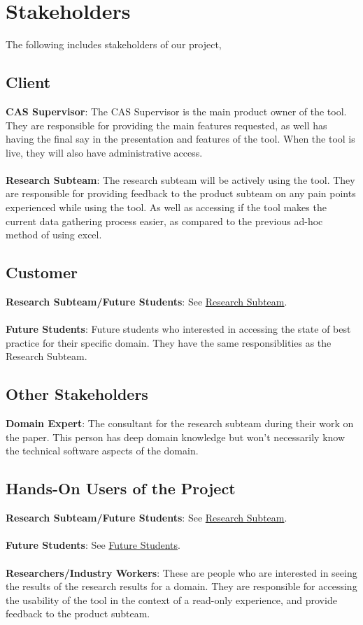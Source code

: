 \documentclass[12pt]{article}
\begin{document}
\section{Stakeholders}
The following includes stakeholders of our project, 
\subsection{Client}
\textbf{CAS Supervisor}: The CAS Supervisor is the main product owner of the tool. They are responsible for providing the main features requested, as well has having the final say in the presentation and features of the tool. When the tool is live, they will also have administrative access.
\\\\\textbf{Research Subteam}\label{research_subteam_client}: The research subteam will be actively using the tool. They are responsible for providing feedback to the product subteam on any pain points experienced while using the tool.
As well as accessing if the tool makes the current data gathering process easier, as compared to the previous ad-hoc method of using excel.
\subsection{Customer}
\textbf{Research Subteam/Future Students}: See \hyperref[research_subteam_client]{Research Subteam}.\\
\\\textbf{Future Students}\label{future_students}: Future students who interested in accessing the state of best practice for their specific domain. They have the same responsiblities as the Research Subteam.
\subsection{Other Stakeholders}
\textbf{Domain Expert}: The consultant for the research subteam during their work on the paper. This person has deep domain knowledge but won't necessarily know the technical software aspects of the domain.
\subsection{Hands-On Users of the Project}
\textbf{Research Subteam/Future Students}: See \hyperref[research_subteam_client]{Research Subteam}.\\\\
\textbf{Future Students}: See \hyperref[future_students]{Future Students}.\\\\
\textbf{Researchers/Industry Workers}: These are people who are interested in seeing the results of the research results for a domain. They are responsible for accessing the usability of the tool in the context of a read-only experience, and provide feedback to the product subteam.
\end{document}
